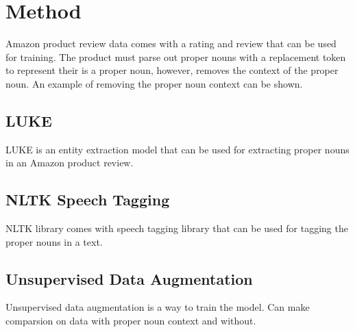 \documentclass[11pt,a4paper]{article}
\begin{document}
\section{Method}

Amazon product review data comes with a rating and review that can be used for training. The product must parse out proper nouns with a replacement token to represent their is a proper noun, however, removes the context of the proper noun. An example of removing the proper noun context can be shown.



\subsection{LUKE}

LUKE is an entity extraction model that can be used for extracting proper nouns in an Amazon product review.

\subsection{NLTK Speech Tagging}

NLTK library comes with speech tagging library that can be used for tagging the proper nouns in a text.

\subsection{Unsupervised Data Augmentation}

Unsupervised data augmentation is a way to train the model. Can make comparsion on data with proper noun context and without.
\end{document}
